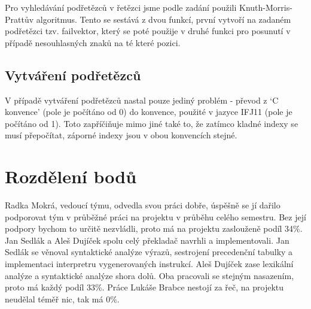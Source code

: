 \documentclass[a4paper,11pt,titlepage]{article}
\begin{document}
Pro vyhledávání podřetězců v řetězci jsme podle zadání použili Knuth-Morris-Prattův algoritmus. Tento se sestává z dvou funkcí, první vytvoří na zadaném podřetězci tzv. failvektor, který se poté použije v druhé funkci pro posunutí v případě nesouhlasných znaků na té které pozici.

\subsection{Vytváření podřetězců}

V případě vytváření podřetězců nastal pouze jediný problém - převod z `C konvence' (pole je počítáno od 0) do konvence, použité v jazyce IFJ11 (pole je počítáno od 1). Toto zapříčiňuje mimo jiné také to, že zatímco kladné indexy se musí přepočítat, záporné indexy jsou v obou konvencích stejné.

\section{Rozdělení bodů}

Radka Mokrá, vedoucí týmu, odvedla svou práci dobře, úspěšně se jí dařilo podporovat tým v průběžné práci na projektu v průběhu celého semestru. Bez její podpory bychom to určitě nezvládli, proto má na projektu zaslouženě podíl 34\%. Jan Sedlák a Aleš Dujíček spolu celý překladač navrhli a implementovali. Jan Sedlák se věnoval syntaktické analýze výrazů, sestrojení precedenční tabulky a implementaci interpretru vygenerovaných instrukcí. Aleš Dujíček zase lexikální analýze a syntaktické analýze shora dolů. Oba pracovali se stejným nasazením, proto má každý podíl 33\%. Práce Lukáše Brabce nestojí za řeč, na projektu neudělal téměř nic, tak má 0\%.
\end{document}
